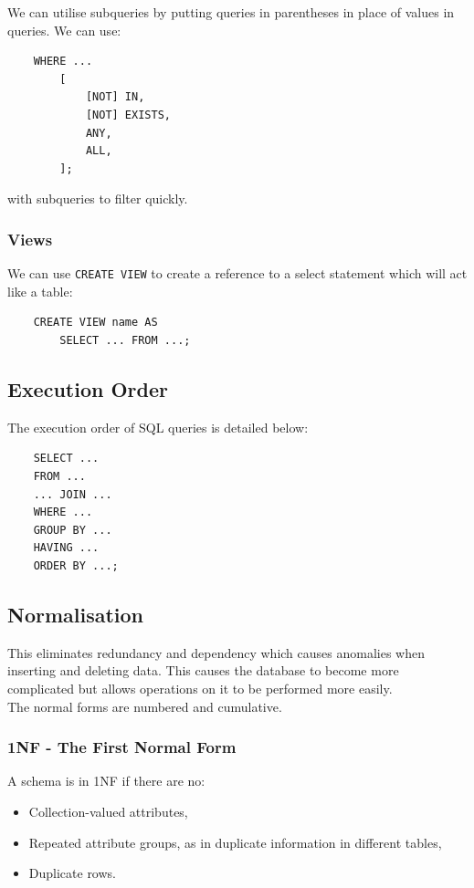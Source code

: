 We can utilise subqueries by putting queries in
parentheses in place of values in queries. We can
use: \begin{lstlisting}
    WHERE ...
        [
            [NOT] IN,
            [NOT] EXISTS,
            ANY,
            ALL,
        ];
\end{lstlisting} with subqueries to filter quickly.

\subsubsection{Views}

We can use \texttt{CREATE VIEW} to create a reference to a select statement
which will act like a table: \begin{lstlisting}
    CREATE VIEW name AS
        SELECT ... FROM ...;
\end{lstlisting}

\subsection{Execution Order}

The execution order of SQL queries is detailed below:
\begin{lstlisting}
    SELECT ...
    FROM ...
    ... JOIN ... 
    WHERE ...
    GROUP BY ...
    HAVING ...
    ORDER BY ...;
\end{lstlisting}

\subsection{Normalisation}

This eliminates redundancy and dependency which causes anomalies when inserting
and deleting data. This causes the database to become more complicated but
allows operations on it to be performed more easily.
\\[\baselineskip]
The normal forms are numbered and cumulative.

\subsubsection{1NF - The First Normal Form}

A schema is in 1NF if there are no: \begin{itemize}
    \item Collection-valued attributes,
    \item Repeated attribute groups, as in duplicate
    information in different tables,
    \item Duplicate rows.
\end{itemize}

